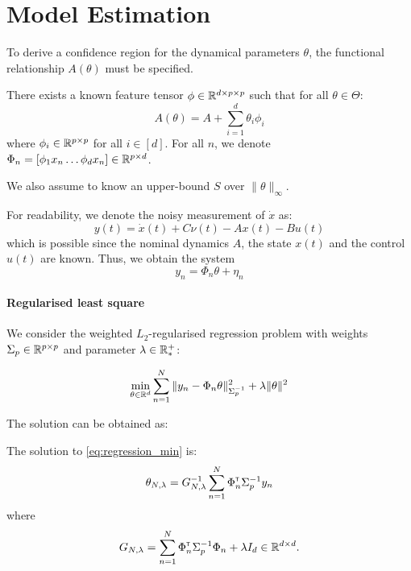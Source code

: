 \documentclass{article}
\begin{document}
\section{Model Estimation}

\label{sec:estimation}

To derive a confidence region for the dynamical parameters $\theta$, the functional relationship $A(\theta)$ must be specified.
\begin{assumption}[Structure]
\label{assumpt:structure}
There exists a known feature tensor $\phi\in \mathbb{R}^{d \times p \times p}$ such that for all $\theta\in\Theta$:
\begin{equation}
    A(\theta) = A + %
    \sum_{i=1}^d \theta_i\phi_i
\end{equation}
where $\phi_i\in\mathbb{R}^{p\times p}$ for all $i\in[d]$. For all $n$, we denote $\Phi_n = [\phi_1 x_n \dots \phi_d x_n]\in\mathbb{R}^{p\times d}$.

We also assume to know an upper-bound $S$ over $\|\theta\|_\infty$.
\end{assumption}

For readability, we denote the noisy measurement of $\dot{x}$ as:
\begin{equation}
\label{eq:measurement}
    y(t) = \dot{x}(t) + C\nu(t) - A x(t) - Bu(t)
\end{equation}
which is possible since the nominal dynamics $A$, the state $x(t)$ and the control $u(t)$ are known.
Thus, we obtain the system
\[
y_n = \Phi_n\theta + \eta_n
\]

\paragraph{Regularised least square} We consider the weighted $L_2$-regularised regression problem with weights  $\Sigma_p\in\mathbb{R}^{p\times p}$ and parameter $\lambda\in\mathbb{R}^+_*$:


\begin{equation}
    \label{eq:regression_min}
    \min_{\theta\in\mathbb{R}^d} \sum_{n=1}^N \|y_n -\Phi_n\theta\|_{\Sigma_p^{-1}}^2 + \lambda\|\theta\|_{}^2
\end{equation}


The solution can be obtained as:

\begin{proposition}
\label{prop:regularized_solution}
The solution to \eqref{eq:regression_min} is:
\begin{equation}
    \label{eq:vector_rls}
    \theta_{N,\lambda} = G_{N, \lambda}^{-1} \sum_{n=1}^N \Phi_n^{\mathsf{\scriptscriptstyle T}} \Sigma_p^{-1} y_n
\end{equation}
where 
\begin{equation}
\label{eq:g_n_lambda}
    G_{N, \lambda} = \sum_{n=1}^N \Phi_{n}^{\mathsf{\scriptscriptstyle T}}\Sigma_p^{-1}\Phi_{n}  + \lambda I_d \in \mathbb{R}^{d\times d}.
\end{equation}
\end{proposition}
\end{document}
